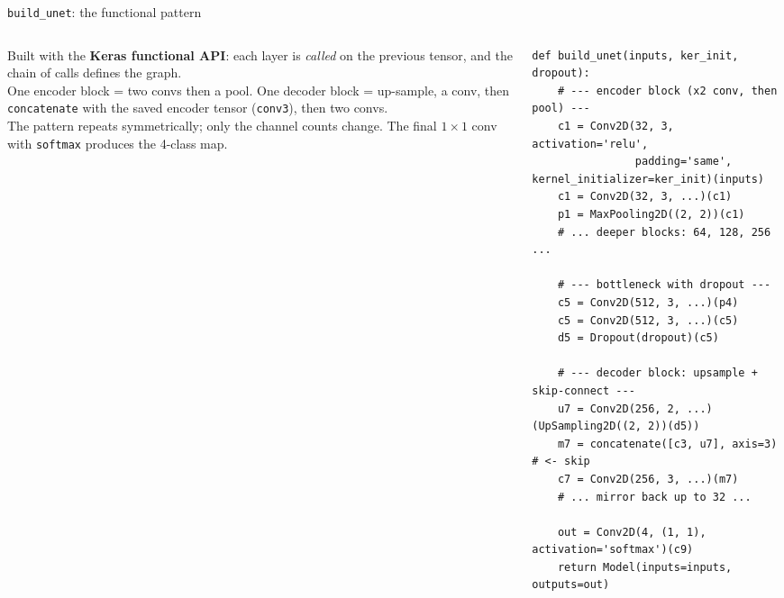 \documentclass[10pt,aspectratio=169]{beamer}
\begin{document}
\begin{frame}[fragile]{\texttt{build\_unet}: the functional pattern}
\begin{columns}[T,onlytextwidth]
\begin{column}{0.42\textwidth}
\small
Built with the \textbf{Keras functional API}: each layer is \emph{called} on the previous tensor,
and the chain of calls defines the graph.\\[0.4em]
One encoder block = two convs then a pool. One decoder block = up-sample, a conv, then
\texttt{concatenate} with the saved encoder tensor (\texttt{conv3}), then two convs.\\[0.4em]
The pattern repeats symmetrically; only the channel counts change. The final $1\times1$ conv with
\texttt{softmax} produces the 4-class map.
\end{column}
\begin{column}{0.56\textwidth}
\begin{lstlisting}[firstnumber=last]
def build_unet(inputs, ker_init, dropout):
    # --- encoder block (x2 conv, then pool) ---
    c1 = Conv2D(32, 3, activation='relu',
                padding='same', kernel_initializer=ker_init)(inputs)
    c1 = Conv2D(32, 3, ...)(c1)
    p1 = MaxPooling2D((2, 2))(c1)
    # ... deeper blocks: 64, 128, 256 ...

    # --- bottleneck with dropout ---
    c5 = Conv2D(512, 3, ...)(p4)
    c5 = Conv2D(512, 3, ...)(c5)
    d5 = Dropout(dropout)(c5)

    # --- decoder block: upsample + skip-connect ---
    u7 = Conv2D(256, 2, ...)(UpSampling2D((2, 2))(d5))
    m7 = concatenate([c3, u7], axis=3)   # <- skip
    c7 = Conv2D(256, 3, ...)(m7)
    # ... mirror back up to 32 ...

    out = Conv2D(4, (1, 1), activation='softmax')(c9)
    return Model(inputs=inputs, outputs=out)
\end{lstlisting}
\end{column}
\end{columns}
\end{frame}
\end{document}
